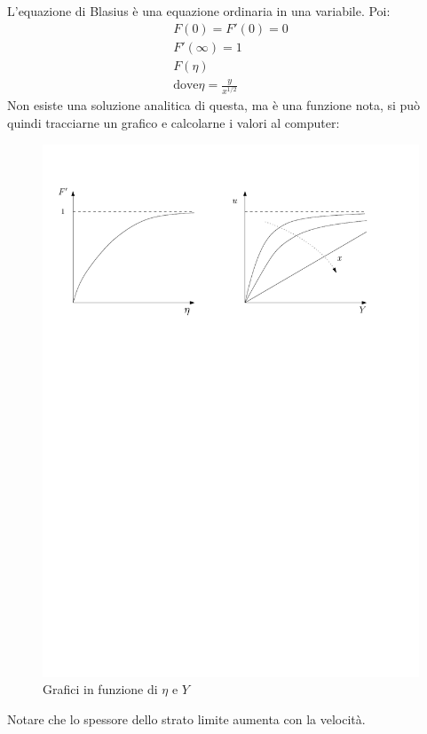 %
L'equazione di Blasius è una equazione ordinaria in una variabile.
Poi:
%
	\begin{equation*}
		\begin{gathered}
			F(0) = F'(0) = 0\\
			F'(\infty) = 1\\
			F(\eta)\\
			\text{dove}
			\eta = \frac{y}{x^{1/2}}
		\end{gathered}
	\end{equation*}
%
Non esiste una soluzione analitica di questa, ma è una funzione nota, si può quindi tracciarne un grafico e calcolarne i valori al computer:
	\begin{figure}[ht]
		\includegraphics[scale=0.7]{./7.4 Strato limite/7.4-3}
		\centering
		\caption{Grafici in funzione di $\eta$ e $Y$}
	\end{figure}
%
Notare che lo spessore dello strato limite aumenta con la velocità.

